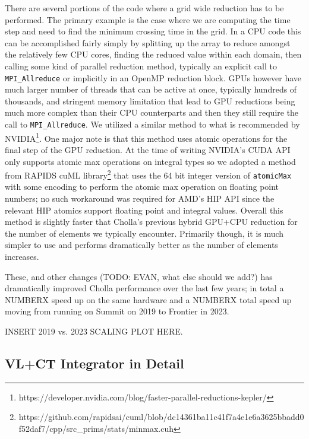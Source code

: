 There are several portions of the code where a grid wide reduction has to be performed. The primary example is the case where we are computing the time step and need to find the minimum crossing time in the grid. In a CPU code this can be accomplished fairly simply by splitting up the array to reduce amongst the relatively few CPU cores, finding the reduced value within each domain, then calling some kind of parallel reduction method, typically an explicit call to \texttt{MPI\_Allreduce} or implicitly in an OpenMP reduction block. GPUs however have much larger number of threads that can be active at once, typically hundreds of thousands, and stringent memory limitation that lead to GPU reductions being much more complex than their CPU counterparts and then they still require the call to \texttt{MPI\_Allreduce}. We utilized a similar method to what is recommended by NVIDIA\footnote{https://developer.nvidia.com/blog/faster-parallel-reductions-kepler/}. One major note is that this method uses atomic operations for the final step of the GPU reduction. At the time of writing NVIDIA's CUDA API only supports atomic max operations on integral types so we adopted a method from RAPIDS cuML library\footnote{https://github.com/rapidsai/cuml/blob/dc14361ba11c41f7a4e1e6a3625bbadd0f52daf7/cpp/src\_prims/stats/minmax.cuh} that uses the 64 bit integer version of \texttt{atomicMax} with some encoding to perform the atomic max operation on floating point numbers; no such workaround was required for AMD's HIP API since the relevant HIP atomics support floating point and integral values. Overall this method is slightly faster that Cholla's previous hybrid GPU+CPU reduction for the number of elements we typically encounter. Primarily though, it is much simpler to use and performs dramatically better as the number of elements increases.

These, and other changes (TODO: EVAN, what else should we add?) has dramatically improved Cholla performance over the last few years; in total a NUMBERX speed up on the same hardware and a NUMBERX total speed up moving from running on Summit on 2019 to Frontier in 2023.

INSERT 2019 vs. 2023 SCALING PLOT HERE.

\subsection{VL+CT Integrator in Detail}
\label{vlct:header}

